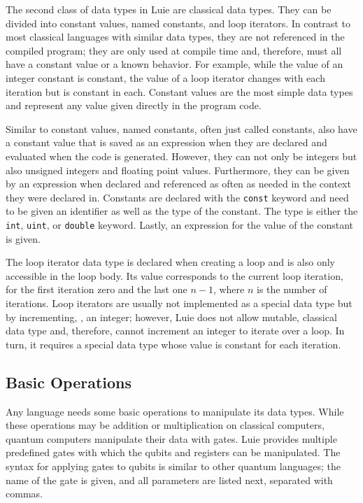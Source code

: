 The second class of data types in Luie are classical data types. They can be divided into constant values, named constants, and loop iterators. In contrast to most classical languages with similar data types, they are not referenced in the compiled program; they are only used at compile time and, therefore, must all have a constant value or a known behavior. For example, while the value of an integer constant is constant, the value of a loop iterator changes with each iteration but is constant in each.
Constant values are the most simple data types and represent any value given directly in the program code. 

Similar to constant values, named constants, often just called constants, also have a constant value that is saved as an expression when they are declared and evaluated when the code is generated. However, they can not only be integers but also unsigned integers and floating point values. Furthermore, they can be given by an expression when declared and referenced as often as needed in the context they were declared in. Constants are declared with the \texttt{const} keyword and need to be given an identifier as well as the type of the constant. The type is either the \texttt{int}, \texttt{uint}, or \texttt{double} keyword. Lastly, an expression for the value of the constant is given.

The loop iterator data type is declared when creating a loop and is also only accessible in the loop body. Its value corresponds to the current loop iteration, \eg for the first iteration zero and the last one $n - 1$, where $n$ is the number of iterations. Loop iterators are usually not implemented as a special data type but by incrementing, \eg, an integer; however, Luie does not allow mutable, classical data type and, therefore, cannot increment an integer to iterate over a loop. In turn, it requires a special data type whose value is constant for each iteration.

\subsection{Basic Operations}
\label{sec:concept_basicOperations}
Any language needs some basic operations to manipulate its data types. While these operations may be addition or multiplication on classical computers, quantum computers manipulate their data with gates. Luie provides multiple predefined gates with which the qubits and registers can be manipulated. The syntax for applying gates to qubits is similar to other quantum languages; the name of the gate is given, and all parameters are listed next, separated with commas.

